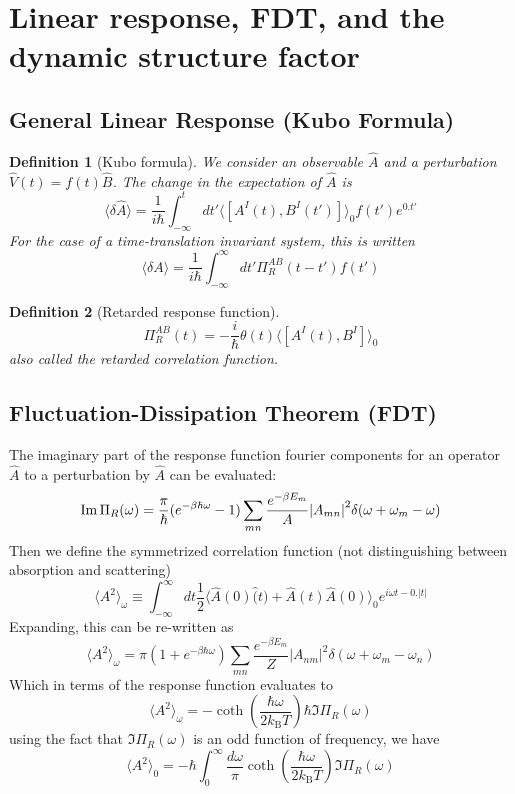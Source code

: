 \documentclass[10pt]{article}
\newcommand{\kb}{k_{\text{B}}}
\newtheorem*{defn}{Definition}
\begin{document}
\section{Linear response, FDT, and the dynamic structure factor}
\subsection{General Linear Response (Kubo Formula)}
\begin{defn}[Kubo formula]
We consider an observable $\hat A$ and a perturbation $\hat V(t) = f(t)\hat B$. The change in the expectation of $\hat A$ is
$$
\langle \delta \hat A \rangle = \frac{1}{i\hbar} \int_{-\infty}^t dt' \langle [A^I(t), B^I(t')]\rangle_0f(t')e^{0.t'}
$$
For the case of a time-translation invariant system, this is written
$$
\langle \delta A \rangle  = \frac{1}{i\hbar}\int_{-\infty}^\infty dt' \Pi^{AB}_R(t-t')f(t')
$$
\end{defn}
\begin{defn}[Retarded response function]
$$
\Pi^{AB}_R(t) =-\frac{i}{\hbar} \theta(t)\langle [A^I(t), B^I]\rangle_0
$$
also called the retarded correlation function.
\end{defn}

\subsection{Fluctuation-Dissipation Theorem (FDT)}
The imaginary part of the response function fourier components for an operator $\hat A$ to a perturbation by $\hat A$ can be evaluated:
$$
\Im \Pi_R(\omega) = \frac{\pi}{\hbar}(e^{-\beta \hbar \omega}-1)\sum_{mn}\frac{e^{-\beta E_m}}{A}\qty|A_{mn}|^2 \delta(\omega+\omega_m-\omega)
$$
Then we define the symmetrized correlation function (not distinguishing between absorption and scattering)
$$
\langle A^2 \rangle_\omega \equiv \int_{-\infty}^\infty dt \frac{1}{2} \langle \hat A(0) \hat (t) + \hat A(t) \hat A(0) \rangle_0 e^{i\omega t - 0.|t|}
$$
Expanding, this can be re-written as
$$
\langle A^2 \rangle_{\omega} = \pi (1+e^{-\beta \hbar \omega})\sum_{mn} \frac{e^{-\beta E_m}}{Z}|A_{nm}|^2\delta(\omega + \omega_m - \omega_n)
$$
Which in terms of the response function evaluates to 
$$
\langle A^2 \rangle_\omega = -\coth(\frac{\hbar \omega}{2\kb T})\hbar \Im \Pi_R(\omega)
$$
using the fact that $\Im \Pi_R(\omega)$ is an odd function of frequency, we have
$$
\langle A^2 \rangle_{0} = -\hbar \int_0^\infty \frac{d\omega}{\pi}\coth(\frac{\hbar \omega}{2\kb T})\Im \Pi_R(\omega)
$$
\end{document}
